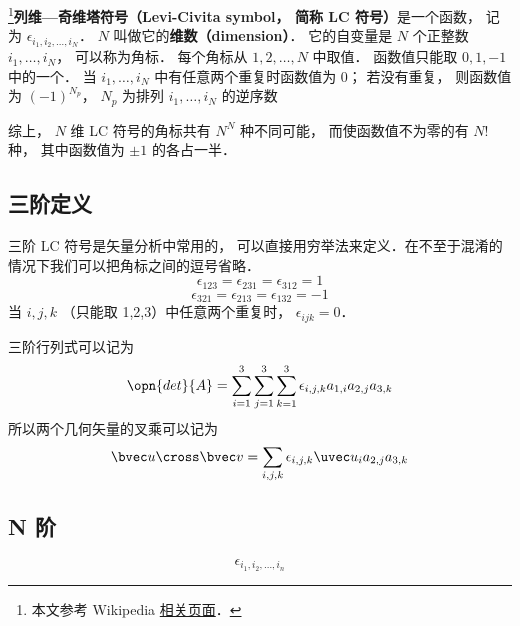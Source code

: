 
\begin{issues}
\issueDraft
\end{issues}


\footnote{本文参考 Wikipedia \href{https://en.wikipedia.org/wiki/Levi-Civita_symbol}{相关页面}．}\textbf{列维—奇维塔符号（Levi-Civita symbol， 简称 LC 符号）}是一个函数， 记为 $\epsilon_{i_1, i_2, \dots, i_N}$． $N$ 叫做它的\textbf{维数（dimension）}． 它的自变量是 $N$ 个正整数 $i_1, \dots, i_N$， 可以称为角标． 每个角标从 $1, 2, \dots, N$ 中取值． 函数值只能取 $0, 1, -1$ 中的一个． 当 $i_1, \dots, i_N$ 中有任意两个重复时函数值为 0； 若没有重复， 则函数值为 $(-1)^{N_p}$， $N_p$ 为排列 $i_1, \dots, i_N$ 的逆序数

综上， $N$ 维 LC 符号的角标共有 $N^N$ 种不同可能， 而使函数值不为零的有 $N!$ 种， 其中函数值为 $\pm 1$ 的各占一半．

\subsection{三阶定义}
三阶 LC 符号是矢量分析中常用的， 可以直接用穷举法来定义．在不至于混淆的情况下我们可以把角标之间的逗号省略．
\begin{equation}
\epsilon_{123} = \epsilon_{231} = \epsilon_{312} = 1
\end{equation}
\begin{equation}
\epsilon_{321} = \epsilon_{213} = \epsilon_{132} = -1
\end{equation}
当 $i,j,k$ （只能取 1,2,3）中任意两个重复时， $\epsilon_{ijk} = 0$．

三阶行列式可以记为
\begin{equation}
\opn{det}{A} = \sum_{i = 1}^3 \sum_{j = 1}^3 \sum_{k = 1}^3 \epsilon_{i,j,k} a_{1,i} a_{2,j} a_{3,k}
\end{equation}
所以两个几何矢量的叉乘可以记为
\begin{equation}
\bvec u \cross \bvec v = \sum_{i,j,k} \epsilon_{i,j,k} \uvec u_i a_{2,j} a_{3,k}
\end{equation}

\subsection{N 阶}
\begin{equation}
\epsilon_{i_1,i_2,\dots, i_n}
\end{equation}

